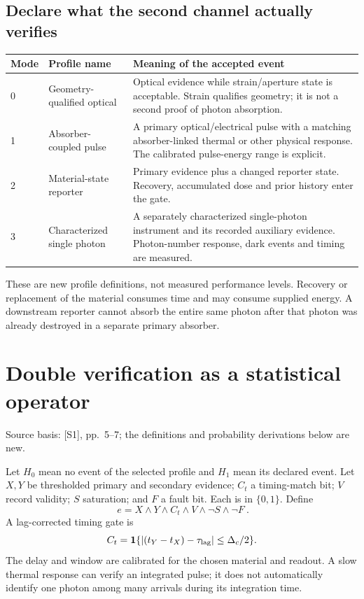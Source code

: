 \documentclass[10pt,a4paper]{article}
\numberwithin{equation}{section}
\newcommand{\src}[1]{\textcolor{muted}{\footnotesize Source basis: #1.}}
\newcommand{\newpart}{\clearpage}
\newcommand{\bb}{\{0,1\}}
\newcommand{\ind}{\mathbf{1}}
\begin{document}
\subsection*{Declare what the second channel actually verifies}
\small
\begin{tabularx}{\linewidth}{@{}P{10mm}P{40mm}Y@{}}
\toprule
\textbf{Mode} & \textbf{Profile name} & \textbf{Meaning of the accepted event}\\
 & Geometry-qualified optical & Optical evidence while strain/aperture state is acceptable. Strain qualifies geometry; it is not a second proof of photon absorption.\\
1 & Absorber-coupled pulse & A primary optical/electrical pulse with a matching absorber-linked thermal or other physical response. The calibrated pulse-energy range is explicit.\\
2 & Material-state reporter & Primary evidence plus a changed reporter state. Recovery, accumulated dose and prior history enter the gate.\\
3 & Characterized single photon & A separately characterized single-photon instrument and its recorded auxiliary evidence. Photon-number response, dark events and timing are measured.\\
\bottomrule
\end{tabularx}
\normalsize
These are new profile definitions, not measured performance levels. Recovery or replacement of the material consumes time and may consume supplied energy. A downstream reporter cannot absorb the entire same photon after that photon was already destroyed in a separate primary absorber.

\newpart
\section{Double verification as a statistical operator}
\label{sec:gate}
\src{[S1], pp.~5--7; the definitions and probability derivations below are new}

Let $H_0$ mean no event of the selected profile and $H_1$ mean its declared event. Let $X,Y$ be thresholded primary and secondary evidence; $C_t$ a timing-match bit; $V$ record validity; $S$ saturation; and $F$ a fault bit. Each is in $\bb$. Define
\begin{equation}
\boxed{\ e=X\land Y\land C_t\land V\land\neg S\land\neg F\ }.
\label{eq:gate}
\end{equation}
A lag-corrected timing gate is
\begin{equation}
C_t=\ind\{|(t_Y-t_X)-\tau_{\rm lag}|\le\Delta_c/2\}.
\end{equation}
The delay and window are calibrated for the chosen material and readout. A slow thermal response can verify an integrated pulse; it does not automatically identify one photon among many arrivals during its integration time.
\end{document}
